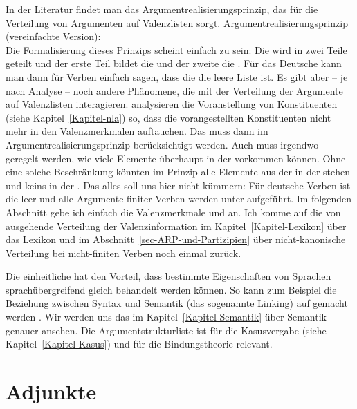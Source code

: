 \noindent
In der Literatur findet man das Argumentrealisierungsprinzip, das für die Verteilung von Argumenten
auf Valenzlisten sorgt.
\ea
\label{Prinzip-Argumentrealisierung-einfach}%
Argumentrealisierungsprinzip (vereinfachte Version):\\[2pt]
 \impl
{}
\z
Die Formalisierung dieses Prinzips scheint einfach zu sein: Die \argstl wird in zwei Teile geteilt
und der erste Teil bildet die \sprl und der zweite die \compsl. Für das Deutsche kann man dann
für Verben einfach sagen, dass die \sprl die leere Liste ist. Es gibt aber – je nach Analyse – noch andere Phänomene,
die mit der Verteilung der Argumente auf Valenzlisten interagieren. \citet[]{GSag2000a-u} analysieren
die Voranstellung von Konstituenten (siehe Kapitel~\ref{Kapitel-nla}) so, dass die vorangestellten Konstituenten nicht mehr in den
Valenzmerkmalen auftauchen. Das muss dann im Argumentrealisierungsprinzip berücksichtigt
werden. Auch muss irgendwo geregelt werden, wie viele Elemente überhaupt in der \sprl vorkommen
können. Ohne eine solche Beschränkung könnten im Prinzip alle Elemente aus der \argstl in der \sprl
stehen und keins in der \compsl. Das alles soll uns hier nicht kümmern: Für deutsche Verben
ist die \sprl leer und alle Argumente finiter Verben werden unter \comps aufgeführt. Im folgenden
Abschnitt gebe ich einfach die Valenzmerkmale \spr und \comps an. Ich komme auf die von \argst
ausgehende Verteilung der Valenzinformation im Kapitel~\ref{Kapitel-Lexikon} über das Lexikon und im
Abschnitt~\ref{sec-ARP-und-Partizipien} über nicht-kanonische Verteilung bei nicht-finiten Verben noch einmal zurück.

Die einheitliche \argstl hat den Vorteil, dass bestimmte Eigenschaften von Sprachen sprachübergreifend
gleich behandelt werden können. So kann zum Beispiel die Beziehung zwischen Syntax und Semantik (das
sogenannte Linking) auf \argst gemacht werden \citep*{DKW2024a}. Wir werden uns das im Kapitel~\ref{Kapitel-Semantik}
über Semantik genauer ansehen. Die Argumentstrukturliste ist für die Kasusvergabe (siehe Kapitel~\ref{Kapitel-Kasus})
und für die Bindungstheorie \citep{PS92a,Branco2021a,MuellerBinding} relevant.
  
\section{Adjunkte}
\label{sec-Adjunkte-psg}

